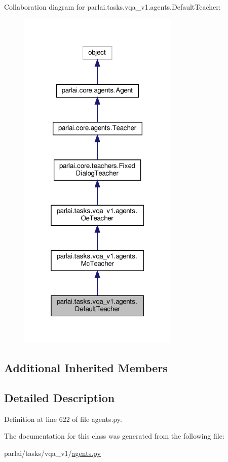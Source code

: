 Collaboration diagram for parlai.\+tasks.\+vqa\+\_\+v1.\+agents.\+Default\+Teacher\+:\nopagebreak
\begin{figure}[H]
\begin{center}
\leavevmode
\includegraphics[width=217pt]{d2/df7/classparlai_1_1tasks_1_1vqa__v1_1_1agents_1_1DefaultTeacher__coll__graph}
\end{center}
\end{figure}
\subsection*{Additional Inherited Members}


\subsection{Detailed Description}


Definition at line 622 of file agents.\+py.



The documentation for this class was generated from the following file\+:\begin{DoxyCompactItemize}
\item 
parlai/tasks/vqa\+\_\+v1/\hyperlink{parlai_2tasks_2vqa__v1_2agents_8py}{agents.\+py}\end{DoxyCompactItemize}

